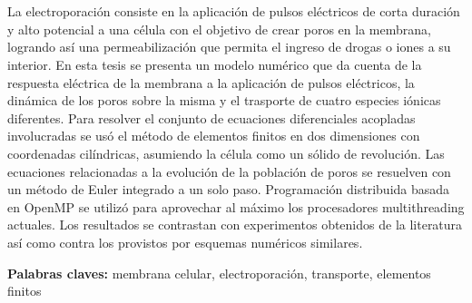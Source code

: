 \chapter*{\runtitulo}

\noindent 
La electroporación consiste en la aplicación de pulsos eléctricos de corta duración y alto potencial a una célula con el objetivo de crear poros en la membrana, logrando así una permeabilización que permita el ingreso de drogas o iones a su interior. En esta tesis se presenta un modelo numérico que da cuenta de la respuesta eléctrica de la membrana a la aplicación de pulsos eléctricos, la dinámica de los poros sobre la misma y el trasporte de cuatro especies iónicas diferentes. Para resolver el conjunto de ecuaciones diferenciales acopladas involucradas se usó el método de elementos finitos en dos dimensiones con coordenadas cilíndricas, asumiendo la célula como un sólido de revolución. Las ecuaciones relacionadas a la evolución de la población de poros se resuelven con un método de Euler integrado a un solo paso. Programación distribuida basada en OpenMP se utilizó para aprovechar al máximo los procesadores multithreading actuales. Los resultados se contrastan con experimentos obtenidos de la literatura así como contra los provistos por esquemas numéricos similares.

\bigskip

\noindent\textbf{Palabras claves:} membrana celular, electroporación, transporte, elementos finitos